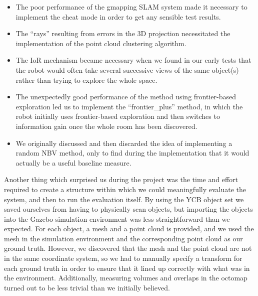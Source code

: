 \begin{itemize}
	\item The poor performance of the gmapping SLAM system made it necessary to implement the cheat mode in order to get any sensible test results.
	\item The ``rays'' resulting from errors in the 3D projection necessitated the implementation of the point cloud clustering algorithm.
	\item The IoR mechanism became necessary when we found in our early tests that the robot would often take several successive views of the same object(s) rather than trying to explore the whole space.
	\item The unexpectedly good performance of the method using frontier-based exploration led us to implement the ``frontier\_plus'' method, in which the robot initially uses frontier-based exploration and then switches to information gain once the whole room has been discovered.
	\item We originally discussed and then discarded the idea of implementing a random NBV method, only to find during the implementation that it would actually be a useful baseline measure.
\end{itemize}


Another thing which surprised us during the project was the time and effort required to create a structure within which we could meaningfully evaluate the system, and then to run the evaluation itself.
By using the YCB object set we saved ourselves from having to physically scan objects, but importing the objects into the Gazebo simulation environment was less straightforward than we expected.
For each object, a mesh and a point cloud is provided, and we used the mesh in the simulation environment and the corresponding point cloud as our ground truth.
However, we discovered that the mesh and the point cloud are not in the same coordinate system, so we had to manually specify a transform for each ground truth in order to ensure that it lined up correctly with what was in the environment.
Additionally, measuring volumes and overlaps in the octomap turned out to be less trivial than we initially believed.

